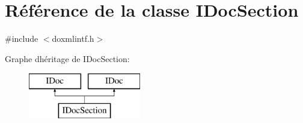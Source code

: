 \hypertarget{class_i_doc_section}{}\section{Référence de la classe I\+Doc\+Section}
\label{class_i_doc_section}


{\ttfamily \#include $<$doxmlintf.\+h$>$}

Graphe d\textquotesingle{}héritage de I\+Doc\+Section\+:\begin{figure}[H]
\begin{center}
\leavevmode
\includegraphics[height=2.000000cm]{class_i_doc_section}
\end{center}
\end{figure}
